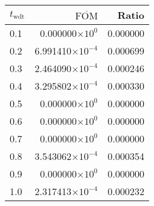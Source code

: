 \begin{tabular}{lrr}
\toprule
$t_{\mathrm{wdt}}$ & $\overline{\mathrm{FOM}}$ &    Ratio \\
\midrule
               0.1 &   0.000000$\times 10^{0}$ & 0.000000 \\
               0.2 &  6.991410$\times 10^{-4}$ & 0.000699 \\
               0.3 &  2.464090$\times 10^{-4}$ & 0.000246 \\
               0.4 &  3.295802$\times 10^{-4}$ & 0.000330 \\
               0.5 &   0.000000$\times 10^{0}$ & 0.000000 \\
               0.6 &   0.000000$\times 10^{0}$ & 0.000000 \\
               0.7 &   0.000000$\times 10^{0}$ & 0.000000 \\
               0.8 &  3.543062$\times 10^{-4}$ & 0.000354 \\
               0.9 &   0.000000$\times 10^{0}$ & 0.000000 \\
               1.0 &  2.317413$\times 10^{-4}$ & 0.000232 \\
\bottomrule
\end{tabular}
